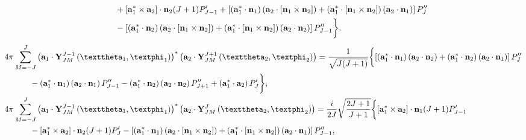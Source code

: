 \begin{enumerate}[label=(\alph*)]
\begin{fleqn}
\begin{subequations}
\begin{align}
& \qquad +\left[\mathbf{a}_{1}^{*} \times \mathbf{a}_{2}\right] \cdot \mathbf{n}_{2}(J+1) P_{J-1}^{\prime}+\left[\left(\mathbf{a}_{1}^{*} \cdot \mathbf{n}_{1}\right)\left(\mathbf{a}_{2} \cdot\left[\mathbf{n}_{1} \times \mathbf{n}_{2}\right]\right)+\left(\mathbf{a}_{1}^{*} \cdot\left[\mathbf{n}_{1} \times \mathbf{n}_{2}\right]\right)\left(\mathbf{a}_{2} \cdot \mathbf{n}_{1}\right)\right] P_{J}^{\prime \prime} \notag\\
& \qquad-\left[\left(\mathbf{a}_{1}^{*} \cdot \mathbf{n}_{2}\right)\left(\mathbf{a}_{2} \cdot\left[\mathbf{n}_{1} \times \mathbf{n}_{2}\right]\right)+\left(\mathbf{a}_{1}^{*} \cdot\left[\mathbf{n}_{1} \times \mathbf{n}_{2}\right]\right)\left(\mathbf{a}_{2} \cdot \mathbf{n}_{2}\right)\right] P_{J-1}^{\prime \prime}\biggr\}.
\end{align}\label{eq:7:3:107}
\end{subequations}
\begin{subequations}
\begin{align}
 4 \pi &\sum_{M=-J}^{J}\left(\vect{a}_{1} \cdot \vect{Y}_{J M}^{J-1}\left(\vartheta_{1}, \varphi_{1}\right)\right)^{*}\left(\vect{a}_{2} \cdot \vect{Y}_{J M}^{J+1}\left(\vartheta_{2}, \varphi_{2}\right)\right)=\frac{1}{\sqrt{J(J+1)}}\biggl\{\left[\left(\vect{a}_{1}^{*} \cdot \vect{n}_{1}\right)\left(\vect{a}_{2} \cdot \vect{n}_{2}\right)+\left(\vect{a}_{1}^{*} \cdot \vect{n}_{2}\right)\left(\vect{a}_{2} \cdot \vect{n}_{1}\right)\right] P_{J}^{\prime \prime}\notag\\
& \qquad-\left(\vect{a}_{1}^{*} \cdot \vect{n}_{1}\right)\left(\vect{a}_{2} \cdot \vect{n}_{1}\right) P_{J-1}^{\prime \prime}-\left(\vect{a}_{1}^{*} \cdot \vect{n}_{2}\right)\left(\vect{a}_{2} \cdot \vect{n}_{2}\right) P_{J+1}^{\prime \prime}+\left(\vect{a}_{1}^{*} \cdot \vect{a}_{2}\right) P_{J}^{\prime}\biggr\},
\\
 4 \pi &\sum_{M=-J}^{J}\left(\vect{a}_{1} \cdot \vect{Y}_{J M}^{J-1}\left(\vartheta_{1}, \varphi_{1}\right)\right)^{*}\left(\vect{a}_{2} \cdot \vect{Y}_{J M}^{J}\left(\vartheta_{2}, \varphi_{2}\right)\right)=\frac{i}{2 J} \sqrt{\frac{2 J+1}{J+1}}\biggl\{\left[\vect{a}_{1}^{*} \times \vect{a}_{2}\right] \cdot \vect{n}_{1}(J+1) P_{J-1}^{\prime} \notag\\
& \qquad-\left[\vect{a}_{1}^{*} \times \vect{a}_{2}\right] \cdot \vect{n}_{2}(J+1) P_{J}^{\prime}-\left[\left(\vect{a}_{1}^{*} \cdot \vect{n}_{1}\right)\left(\vect{a}_{2} \cdot\left[\vect{n}_{1} \times \vect{n}_{2}\right]\right)+\left(\vect{a}_{1}^{*} \cdot\left[\vect{n}_{1} \times \vect{n}_{2}\right]\right)\left(\vect{a}_{2} \cdot \vect{n}_{1}\right)\right] P_{J-1}^{\prime \prime}, \notag\\

\end{align}
\end{subequations}
\end{fleqn}
\end{enumerate}
